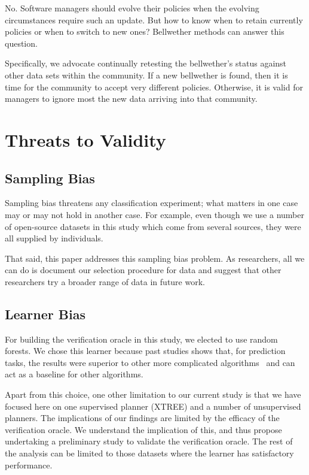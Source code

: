 \documentclass[10pt,journal,compsoc]{IEEEtran}
\begin{document}
No. Software managers should evolve their policies when the evolving circumstances require such an update. But how to know when to retain currently policies or when to switch to new ones? Bellwether methods can answer this question.

Specifically, we advocate continually retesting the bellwether's status against other data sets within the community. If a new bellwether is found,
then it is time for the community to accept very different policies. Otherwise, it is valid for managers to ignore most the new data arriving into that community.

\section{Threats to Validity}
\label{sect:threats}
\subsection{Sampling Bias} 
Sampling bias threatens any classification experiment;
what matters in one case may or may not hold in another case. 
For example, even though we use a number of open-source datasets in 
this study which come from several sources, they were 
all supplied by individuals.  

That said, this paper addresses this sampling bias problem.  As researchers, all we can do is document
our selection procedure for data and suggest that other researchers
try a broader range of data in future work.



\subsection{Learner Bias} 
For building the verification oracle in this
study, we elected to use random forests. We chose this learner
because past studies shows that, for prediction tasks, the 
results were superior to other more complicated algorithms~\cite{lessmann08}  
and can act as a baseline for other algorithms. 

Apart from this choice,
one other limitation to our current study is that we have focused here
on one supervised planner (XTREE) and a number of unsupervised planners.
The implications of our findings are limited by the efficacy of the verification oracle. We understand the implication 
of this, and thus propose undertaking a preliminary study to validate the verification oracle. The rest of the analysis can be 
limited to those datasets where the learner has satisfactory performance.
\end{document}
